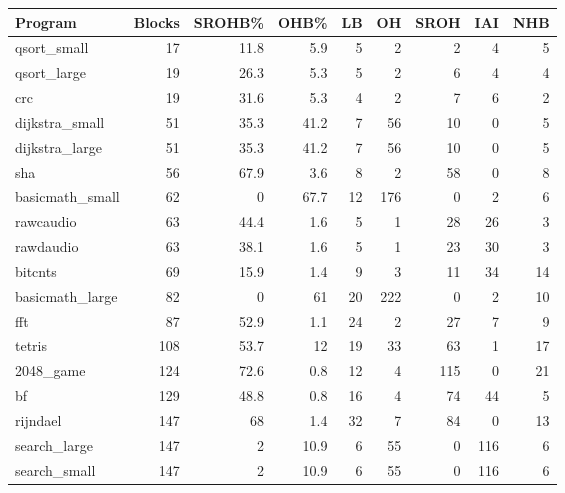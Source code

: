 \begin{tabular}{lrrrrrrrrrr}
\hline
\end{tabular}\begin{tabular}{lrrrrrrrr}
\hline
 Program         &   Blocks &   SROHB\% &   OHB\% &   LB &   OH &   SROH &   IAI &   NHB \\
\hline
 qsort\_small     &       17 &     11.8 &    5.9 &    5 &    2 &      2 &     4 &     5 \\
 qsort\_large     &       19 &     26.3 &    5.3 &    5 &    2 &      6 &     4 &     4 \\
 crc             &       19 &     31.6 &    5.3 &    4 &    2 &      7 &     6 &     2 \\
 dijkstra\_small  &       51 &     35.3 &   41.2 &    7 &   56 &     10 &     0 &     5 \\
 dijkstra\_large  &       51 &     35.3 &   41.2 &    7 &   56 &     10 &     0 &     5 \\
 sha             &       56 &     67.9 &    3.6 &    8 &    2 &     58 &     0 &     8 \\
 basicmath\_small &       62 &      0   &   67.7 &   12 &  176 &      0 &     2 &     6 \\
 rawcaudio       &       63 &     44.4 &    1.6 &    5 &    1 &     28 &    26 &     3 \\
 rawdaudio       &       63 &     38.1 &    1.6 &    5 &    1 &     23 &    30 &     3 \\
 bitcnts         &       69 &     15.9 &    1.4 &    9 &    3 &     11 &    34 &    14 \\
 basicmath\_large &       82 &      0   &   61   &   20 &  222 &      0 &     2 &    10 \\
 fft             &       87 &     52.9 &    1.1 &   24 &    2 &     27 &     7 &     9 \\
 tetris          &      108 &     53.7 &   12   &   19 &   33 &     63 &     1 &    17 \\
 2048\_game       &      124 &     72.6 &    0.8 &   12 &    4 &    115 &     0 &    21 \\
 bf              &      129 &     48.8 &    0.8 &   16 &    4 &     74 &    44 &     5 \\
 rijndael        &      147 &     68   &    1.4 &   32 &    7 &     84 &     0 &    13 \\
 search\_large    &      147 &      2   &   10.9 &    6 &   55 &      0 &   116 &     6 \\
 search\_small    &      147 &      2   &   10.9 &    6 &   55 &      0 &   116 &     6 \\

\end{tabular}
